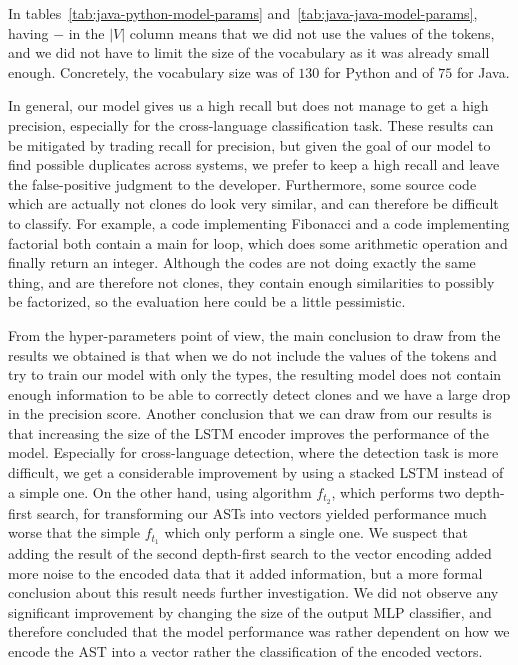 In tables~\ref{tab:java-python-model-params}
and~\ref{tab:java-java-model-params}, having $-$ in the $|V|$ column means that
we did not use the values of the tokens, and we did not have to limit the size
of the vocabulary as it was already small enough. Concretely, the vocabulary
size was of $130$ for Python and of $75$ for Java.

In general, our model gives us a high recall but does not manage to get a high
precision, especially for the cross-language classification task. These results
can be mitigated by trading recall for precision, but given the goal of our
model to find possible duplicates across systems, we prefer to keep a high
recall and leave the false-positive judgment to the developer. Furthermore, some
source code which are actually not clones do look very similar, and can
therefore be difficult to classify. For example, a code implementing Fibonacci
and a code implementing factorial both contain a main for loop, which does some
arithmetic operation and finally return an integer. Although the codes are not
doing exactly the same thing, and are therefore not clones, they contain enough
similarities to possibly be factorized, so the evaluation here could be a little
pessimistic.

From the hyper-parameters point of view, the main conclusion to draw from the
results we obtained is that when we do not include the values of the tokens and
try to train our model with only the types, the resulting model does not contain
enough information to be able to correctly detect clones and we have a large
drop in the precision score.
Another conclusion that we can draw from our results is that increasing the size
of the LSTM encoder improves the performance of the model. Especially for
cross-language detection, where the detection task is more difficult, we get a
considerable improvement by using a stacked LSTM instead of a simple one.
On the other hand, using algorithm $f_{t_2}$, which performs two depth-first
search, for transforming our ASTs into vectors yielded performance much worse
that the simple $f_{t_1}$ which only perform a single one. We suspect that
adding the result of the second depth-first search to the vector encoding added
more noise to the encoded data that it added information, but a more formal
conclusion about this result needs further investigation. We did not observe any
significant improvement by changing the size of the output MLP classifier, and
therefore concluded that the model performance was rather dependent on how we
encode the AST into a vector rather the classification of the encoded vectors. 
